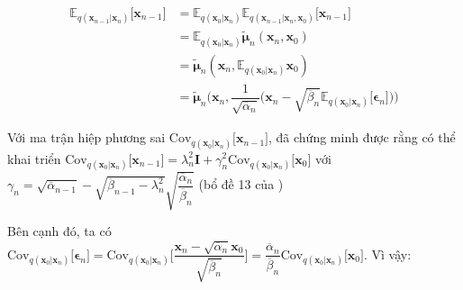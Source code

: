 \documentclass[14pt, a4paper]{article}
\numberwithin{equation}{section}
\numberwithin{figure}{section}
\numberwithin{dl}{section}
\numberwithin{md}{section}
\numberwithin{bd}{section}
\numberwithin{dn}{section}
\numberwithin{hq}{section}
\begin{document}
    \begin{equation*}
        \begin{aligned}
            \mathbb{E}_{q(\boldsymbol{x}_{n-1} \vert \boldsymbol{x}_n)} \lbrack \boldsymbol{x}_{n-1} \rbrack &= \mathbb{E}_{q(\boldsymbol{x}_0 \vert \boldsymbol{x}_n)} \mathbb{E}_{q(\boldsymbol{x}_{n-1} \vert \boldsymbol{x}_n, \boldsymbol{x}_0)} \lbrack \boldsymbol{x}_{n-1} \rbrack \\ 
            &= \mathbb{E}_{q(\boldsymbol{x}_0 \vert \boldsymbol{x}_n)}\tilde{\boldsymbol{\mu}}_n (\boldsymbol{x}_n, \boldsymbol{x}_0) \\
            &= \tilde{\boldsymbol{\mu}}_n (\boldsymbol{x}_n, \mathbb{E}_{q(\boldsymbol{x}_0 \vert \boldsymbol{x}_n)} \boldsymbol{x}_0) \\
            &= \tilde{\boldsymbol{\mu}}_n \Big( \boldsymbol{x}_n, \dfrac{1}{\sqrt{\overline{\alpha}_n}} \big( \boldsymbol{x}_n - \sqrt{\overline{\beta}_n} \mathbb{E}_{q(\boldsymbol{x}_0 \vert \boldsymbol{x}_n)} \lbrack \boldsymbol{\epsilon}_n \rbrack \big) \Big)
        \end{aligned}
    \end{equation*}

    Với ma trận hiệp phương sai $\mathrm{Cov}_{q(\boldsymbol{x}_0 \vert \boldsymbol{x}_n)} \lbrack \boldsymbol{x}_{n-1} \rbrack$, \cite{bao2021analytic} đã chứng minh được rằng có thể khai triển $\mathrm{Cov}_{q(\boldsymbol{x}_0 \vert \boldsymbol{x}_n)} \lbrack \boldsymbol{x}_{n-1} \rbrack = \lambda_n^2 \boldsymbol{I} + \gamma_n^2 \mathrm{Cov}_{q(\boldsymbol{x}_0 \vert \boldsymbol{x}_n)} \lbrack \boldsymbol{x}_0 \rbrack$ với $\gamma_n = \sqrt{\overline{\alpha}_{n-1}} - \sqrt{\overline{\beta}_{n-1} - \lambda_n^2} \sqrt{\dfrac{\overline{\alpha}_n}{\overline{\beta}_n}}$ (bổ đề 13 của \cite{bao2021analytic})

    Bên cạnh đó, ta có $\mathrm{Cov}_{q(\boldsymbol{x}_0 \vert \boldsymbol{x}_n)} \lbrack \boldsymbol{\epsilon}_n \rbrack = \mathrm{Cov}_{q(\boldsymbol{x}_0 \vert \boldsymbol{x}_n)} \Big \lbrack \dfrac{\boldsymbol{x}_n - \sqrt{\overline{\alpha}_n}\boldsymbol{x}_0}{\sqrt{\overline{\beta}_n}} \Big \rbrack = \dfrac{\overline{\alpha}_n}{\overline{\beta}_n} \mathrm{Cov}_{q(\boldsymbol{x}_0 \vert \boldsymbol{x}_n)} \lbrack \boldsymbol{x}_0 \rbrack$. Vì vậy:
\end{document}
